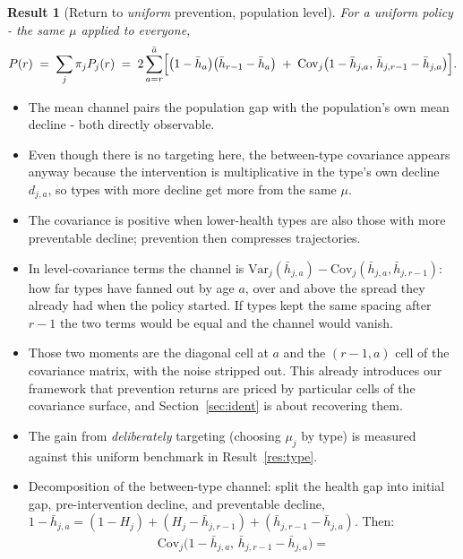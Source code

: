 \documentclass[11pt]{article}
\newtheorem{result}{Result}
\theoremstyle{remark}
\newcommand{\Var}{\mathrm{Var}}
\newcommand{\Cov}{\mathrm{Cov}}
\begin{document}
\begin{result}[Return to \emph{uniform} prevention, population level]\label{res:prevpop}
For a uniform policy - the same $\mu$ applied to everyone,
\begin{equation}
P(r) \;=\; \sum_j \pi_j P_j(r)
\;=\; 2\sum_{a=r}^{\bar a}\Bigl[\bigl(1-\bar h_a\bigr)\bigl(\bar h_{r-1}-\bar h_a\bigr)
\;+\; \Cov_j\bigl(1-\bar h_{j,a},\,\bar h_{j,r-1}-\bar h_{j,a}\bigr)\Bigr].
\label{eq:Ppop}
\end{equation}
\end{result}

\begin{itemize}
\item The mean channel pairs the population gap with the population's own mean decline - both directly observable.
\item Even though there is no targeting here, the between-type covariance appears anyway because the intervention is multiplicative in the type's own decline $d_{j,a}$, so types with more decline get more from the same $\mu$.
\item The covariance is positive when lower-health types are also those with more preventable decline; prevention then compresses trajectories.
\item In level-covariance terms the channel is $\Var_j(\bar h_{j,a})-\Cov_j(\bar h_{j,a},\bar h_{j,r-1})$: how far types have fanned out by age $a$, over and above the spread they already had when the policy started.
If types kept the same spacing after $r-1$ the two terms would be equal and the channel would vanish.
\item Those two moments are the diagonal cell at $a$ and the $(r-1,a)$ cell of the covariance matrix, with the noise stripped out.
This already introduces our framework that prevention returns are priced by particular cells of the covariance surface, and Section~\ref{sec:ident} is about recovering them.
\item The gain from \emph{deliberately} targeting (choosing $\mu_j$ by type) is measured against this uniform benchmark in Result~\ref{res:type}.
\item Decomposition of the between-type channel: split the health gap into initial gap, pre-intervention decline, and preventable decline, $1-\bar h_{j,a}=(1-H_j)+(H_j-\bar h_{j,r-1})+(\bar h_{j,r-1}-\bar h_{j,a})$.
Then:
\begin{equation}
	\begin{gathered}
		\Cov_j\bigl(1-\bar h_{j,a},\,\bar h_{j,r-1}-\bar h_{j,a}\bigr)
		= \\

\end{gathered}
\end{equation}
\end{itemize}
\end{document}
